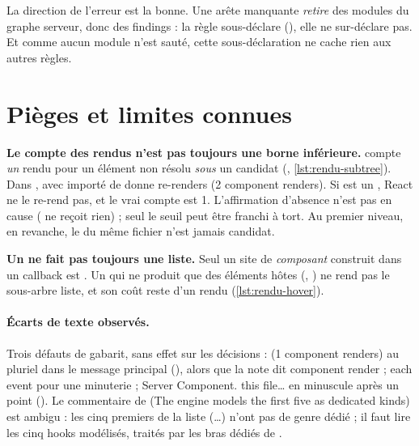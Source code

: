 La direction de l'erreur est la bonne. Une arête manquante \emph{retire} des modules du graphe
serveur, donc des findings : la règle sous-déclare (), elle ne sur-déclare pas. Et comme
aucun module n'est sauté, cette sous-déclaration ne cache rien aux autres règles.

\section{Pièges et limites connues}
\label{sec:regles-rendu-rsc-limites}

\begin{piege}
\textbf{Le compte des rendus n'est pas toujours une borne inférieure.} 
compte \emph{un} rendu pour un élément non résolu \emph{sous} un candidat
(, \cref{lst:rendu-subtree}). Dans ,
 avec  importé de
 donne \og re-renders  (2 component renders)\fg{}. Si  est
un , React ne le re-rend pas, et le vrai compte est 1. L'affirmation d'absence n'est
pas en cause ( ne reçoit rien) ; seul le seuil  peut être franchi
à tort. Au premier niveau, en revanche, le  du même fichier n'est jamais candidat.
\end{piege}

\begin{piege}
\textbf{Un  ne fait pas toujours une liste.} Seul un site de \emph{composant} construit
dans un callback est . Un  qui ne produit que des éléments hôtes
(, ) ne rend pas le sous-arbre \og liste\fg{}, et son coût reste d'un
rendu (\cref{lst:rendu-hover}).
\end{piege}

\paragraph{Écarts de texte observés.} Trois défauts de gabarit, sans effet sur les décisions :
\og (1 component renders)\fg{} au pluriel dans le message principal
(), alors que la note 
dit  component render\fg{} ; \og each  event\fg{} pour une minuterie ;
\og Server Component. this file…\fg{} en minuscule après un point
(). Le commentaire de
 (\og The engine models the first five as dedicated 
kinds\fg{}) est ambigu : les cinq premiers de la liste (\dots) n'ont pas de genre
dédié ; il faut lire \og les cinq hooks modélisés, traités par les bras dédiés de
\fg{}.

